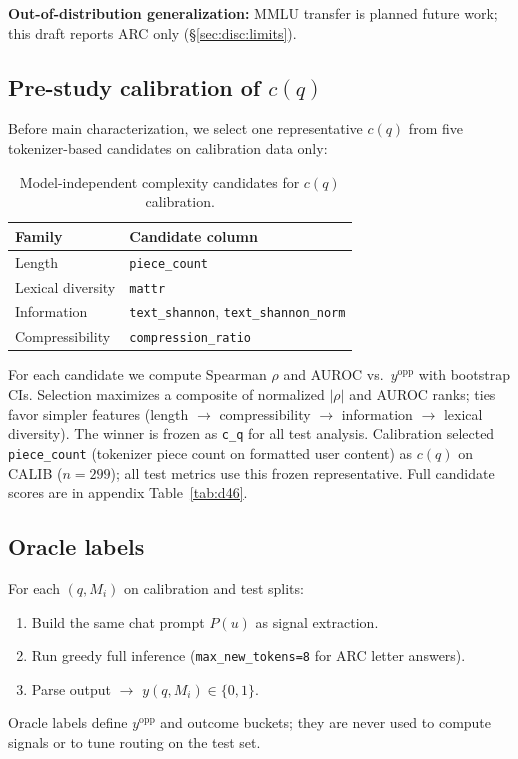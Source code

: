 \textbf{Out-of-distribution generalization:} MMLU \citep{hendrycks2021measuring} transfer is planned future work; this draft reports ARC only (\S\ref{sec:disc:limits}).

\subsection{Pre-study calibration of $c(q)$}
\label{sec:setup:calib}

Before main characterization, we select one representative $c(q)$ from five tokenizer-based candidates on calibration data only:

\begin{table}[t]
  \centering
  \small
  \begin{tabular}{ll}
    \toprule
    \textbf{Family} & \textbf{Candidate column} \\
    \midrule
    Length & \texttt{piece\_count} \\
    Lexical diversity & \texttt{mattr} \\
    Information & \texttt{text\_shannon}, \texttt{text\_shannon\_norm} \\
    Compressibility & \texttt{compression\_ratio} \\
    \bottomrule
  \end{tabular}
  \caption{Model-independent complexity candidates for $c(q)$ calibration.}
  \label{tab:cq-candidates}
\end{table}

For each candidate we compute Spearman $\rho$ and AUROC vs.\ $y^{\text{opp}}$ with bootstrap CIs.
Selection maximizes a composite of normalized $|\rho|$ and AUROC ranks; ties favor simpler features (length $\rightarrow$ compressibility $\rightarrow$ information $\rightarrow$ lexical diversity).
The winner is frozen as \texttt{c\_q} for all test analysis.
Calibration selected \texttt{piece\_count} (tokenizer piece count on formatted user content) as $c(q)$ on CALIB ($n{=}299$); all test metrics use this frozen representative.
Full candidate scores are in appendix Table~\ref{tab:d46}.

\subsection{Oracle labels}
\label{sec:setup:oracle}

For each $(q,M_i)$ on calibration and test splits:
\begin{enumerate}
  \item Build the same chat prompt $P(u)$ as signal extraction.
  \item Run greedy full inference (\texttt{max\_new\_tokens=8} for ARC letter answers).
  \item Parse output $\rightarrow$ $y(q,M_i)\in\{0,1\}$.
\end{enumerate}
Oracle labels define $y^{\text{opp}}$ and outcome buckets; they are never used to compute signals or to tune routing on the test set.

